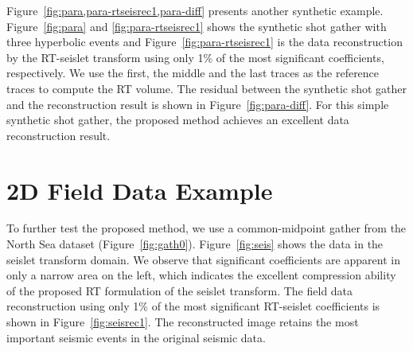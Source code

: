 
    Figure~\ref{fig:para,para-rtseisrec1,para-diff} presents another synthetic 
    example. 
    Figure~\ref{fig:para} and \ref{fig:para-rtseisrec1} shows the synthetic shot 
    gather with three hyperbolic events and Figure~\ref{fig:para-rtseisrec1} is 
    the data reconstruction by the RT-seislet transform using only 1\% of the 
    most significant coefficients, respectively. 
    We use the first, the middle and the last traces as the reference traces to 
    compute the RT volume.
    The residual between the synthetic shot gather and the reconstruction
    result is shown in Figure~\ref{fig:para-diff}.
    For this simple synthetic shot gather, the proposed method achieves an 
    excellent data reconstruction result.

    
\section{2D Field Data Example}
    To further test the proposed method, we use a common-midpoint gather from 
    the North Sea dataset (Figure~\ref{fig:gath0}). 
    Figure~\ref{fig:seis} shows the data in the seislet transform domain. 
    We observe that significant coefficients are apparent in only a narrow area 
    on the left, which indicates the excellent compression ability of the 
    proposed RT formulation of the seislet transform. 
    The field data reconstruction using only 1\% of the most significant 
    RT-seislet coefficients is shown in Figure~\ref{fig:seisrec1}. 
    The reconstructed image retains the most important seismic events in the 
    original seismic data.


